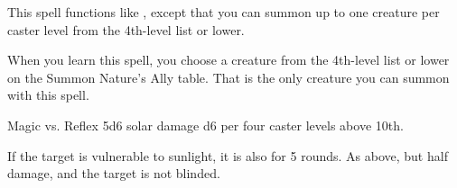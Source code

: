 \begin{spellheader}
\end{spellheader}
\begin{spellcontent}
    \spelleffect This spell functions like , except that you can summon up to one creature per caster level from the 4th-level list or lower.
    \par When you learn this spell, you choose a creature from the 4th-level list or lower on the Summon Nature's Ally table. That is the only creature you can summon with this spell.
    \spelldur{\durshort \dismissable}
\end{spellcontent}
\begin{spellfooter}

\end{spellfooter}

\begin{spellheader}
    \begin{spelltargetinginfo}
    \end{spelltargetinginfo}
    \begin{spelleffects}
    \end{spelleffects}
\end{spellheader}
\begin{spellcontent}
    \begin{spellattack}{Magic vs. Reflex}
        \spellsuccess 5d6 solar damage \add d6 per four caster levels above 10th.

        If the target is vulnerable to sunlight, it is also \blinded for 5 rounds.
        \spellfailure As above, but half damage, and the target is not blinded.
    \end{spellattack}
\end{spellcontent}
\begin{spellfooter}

\end{spellfooter}

